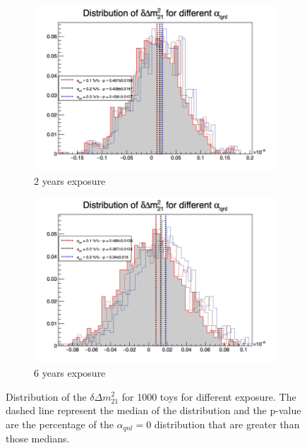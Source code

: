 \documentclass[../main.tex]{subfiles}
\begin{document}
\begin{figure}[th]
  \begin{subfigure}[t]{0.48\linewidth}
    \includegraphics[width=\linewidth]{images/joint_fit/stat_tests/chi2_delta_m_2y.png}
    \caption{2 years exposure}
  \end{subfigure}
  \begin{subfigure}[t]{0.48\linewidth}
    \includegraphics[width=\linewidth]{images/joint_fit/stat_tests/chi2_delta_m_6y.png}
    \caption{6 years exposure}
  \end{subfigure}
  \caption{Distribution of the $\delta \Delta m^2_{21}$ for 1000 toys for different exposure. The dashed line represent the median of the distribution and the p-value are the percentage of the $\alpha_{qnl} = 0$ distribution that are greater than those medians.}
  \label{fig:joint_fit:chi2_delta_m}
\end{figure}
\end{document}
